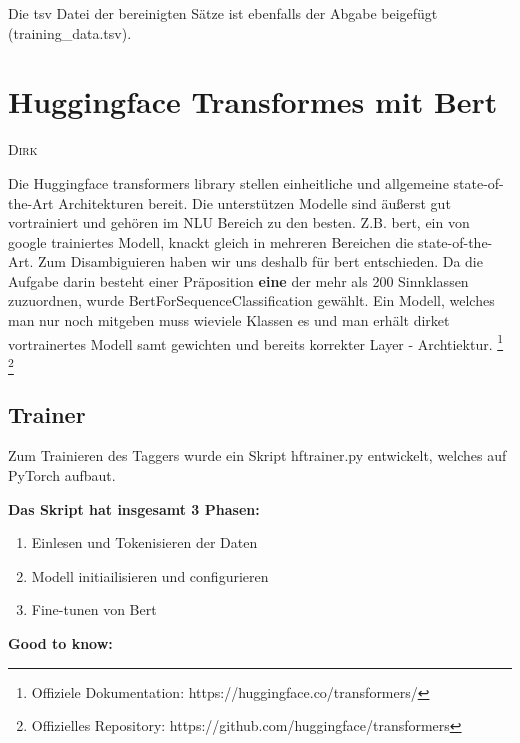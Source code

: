\documentclass[10pt,a4paper]{article}
\newcommand{\chapterauthor}[1]{%
	{\parindent0pt\vspace*{-5pt}\hspace*{\fill}%
  \linespread{1.1}\large\scshape#1%
  \par\nobreak\vspace*{10pt}}
}
\begin{document}
Die tsv Datei der bereinigten Sätze ist ebenfalls der Abgabe beigefügt (training\_data.tsv).

\newpage

\section{Huggingface Transformes mit Bert}
\chapterauthor{Dirk}
Die Huggingface transformers library stellen einheitliche und allgemeine state-of-the-Art Architekturen bereit. Die unterstützen Modelle sind äußerst gut vortrainiert und gehören im NLU Bereich zu den besten. Z.B. bert, ein von google trainiertes Modell, knackt gleich in mehreren Bereichen die state-of-the-Art. Zum Disambiguieren haben wir uns deshalb für bert entschieden. Da die Aufgabe darin besteht einer Präposition \textbf{eine} der mehr als 200 Sinnklassen zuzuordnen, wurde BertForSequenceClassification gewählt. Ein Modell, welches man nur noch mitgeben muss wieviele Klassen es und man erhält dirket vortrainertes Modell samt gewichten und bereits korrekter Layer - Archtiektur. \footnote{Offiziele Dokumentation: https://huggingface.co/transformers/} \footnote{Offizielles Repository: https://github.com/huggingface/transformers}

\subsection{Trainer}
Zum Trainieren des Taggers wurde ein Skript hftrainer.py entwickelt, welches auf PyTorch aufbaut.

\vspace{0.25cm}
\textbf{Das Skript hat insgesamt 3 Phasen:}

\begin{enumerate}
	\item Einlesen und Tokenisieren der Daten
	\item Modell initiailisieren und configurieren
	\item Fine-tunen von Bert
\end{enumerate}


\textbf{Good to know:}
\end{document}
